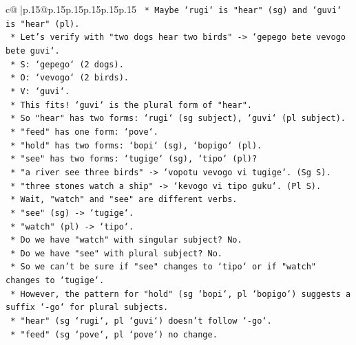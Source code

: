 \documentclass{article}
\begin{document}
{\begin{supertabular}{c@{$\;$}|p{.15\linewidth}@{}p{.15\linewidth}p{.15\linewidth}p{.15\linewidth}p{.15\linewidth}p{.15\linewidth}}
{{{\texttt{                    *   Maybe `rugi` is "hear" (sg) and `guvi` is "hear" (pl).} \\
\texttt{                    *   Let's verify with "two dogs hear two birds" {-}> `gepego bete vevogo bete guvi`.} \\
\texttt{                        *   S: `gepego` (2 dogs).} \\
\texttt{                        *   O: `vevogo` (2 birds).} \\
\texttt{                        *   V: `guvi`.} \\
\texttt{                        *   This fits! `guvi` is the plural form of "hear".} \\
\texttt{                    *   So "hear" has two forms: `rugi` (sg subject), `guvi` (pl subject).} \\
\texttt{                    *   "feed" has one form: `pove`.} \\
\texttt{                    *   "hold" has two forms: `bopi` (sg), `bopigo` (pl).} \\
\texttt{                    *   "see" has two forms: `tugige` (sg), `tipo` (pl)?} \\
\texttt{                        *   "a river see three birds" {-}> `vopotu vevogo vi tugige`. (Sg S).} \\
\texttt{                        *   "three stones watch a ship" {-}> `kevogo vi tipo guku`. (Pl S).} \\
\texttt{                        *   Wait, "watch" and "see" are different verbs.} \\
\texttt{                        *   "see" (sg) {-}> `tugige`.} \\
\texttt{                        *   "watch" (pl) {-}> `tipo`.} \\
\texttt{                        *   Do we have "watch" with singular subject? No.} \\
\texttt{                        *   Do we have "see" with plural subject? No.} \\
\texttt{                        *   So we can't be sure if "see" changes to `tipo` or if "watch" changes to `tugige`.} \\
\texttt{                        *   However, the pattern for "hold" (sg `bopi`, pl `bopigo`) suggests a suffix `{-}go` for plural subjects.} \\
\texttt{                        *   "hear" (sg `rugi`, pl `guvi`) doesn't follow `{-}go`.} \\
\texttt{                        *   "feed" (sg `pove`, pl `pove`) no change.} \\
}}}
\end{supertabular}}
\end{document}
